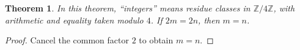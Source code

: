 \documentclass{article}
\newtheorem{theorem}{Theorem}
\begin{document}
\begin{theorem}\label{thm:modular-integer-cancellation-gap}
In this theorem, ``integers'' means residue classes in $\mathbb Z/4\mathbb Z$, with arithmetic and equality taken modulo $4$. If $2m=2n$, then $m=n$.
\end{theorem}
\begin{proof}
Cancel the common factor $2$ to obtain $m=n$.
\end{proof}
\end{document}
